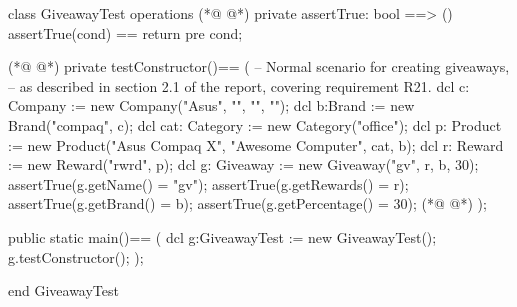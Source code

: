 \begin{vdmpp}[breaklines=true]
class GiveawayTest
 operations
(*@
\label{assertTrue:3}
@*)
  private assertTrue: bool ==> ()
    assertTrue(cond) == return
    pre cond;
    
(*@
\label{testConstructor:7}
@*)
  private testConstructor()==
  (
    -- Normal scenario for creating giveaways,
     -- as described in section 2.1 of the report, covering requirement R21.
      dcl c: Company := new Company("Asus", "", "", "");
      dcl b:Brand := new Brand("compaq", c);
      dcl cat: Category := new Category("office");
      dcl p: Product := new Product("Asus Compaq X", "Awesome Computer", cat, b);
      dcl r: Reward := new Reward("rwrd", p);
   dcl g: Giveaway := new Giveaway("gv", {r}, b, 30);
   assertTrue(g.getName() = "gv");
   assertTrue(g.getRewards() = {r});
   assertTrue(g.getBrand() = b);
   assertTrue(g.getPercentage() = 30);
(*@
\label{main:21}
@*)
  );
  
  public static main()==
    (
   dcl g:GiveawayTest := new GiveawayTest();
   g.testConstructor();
    );

end GiveawayTest
\end{vdmpp}
